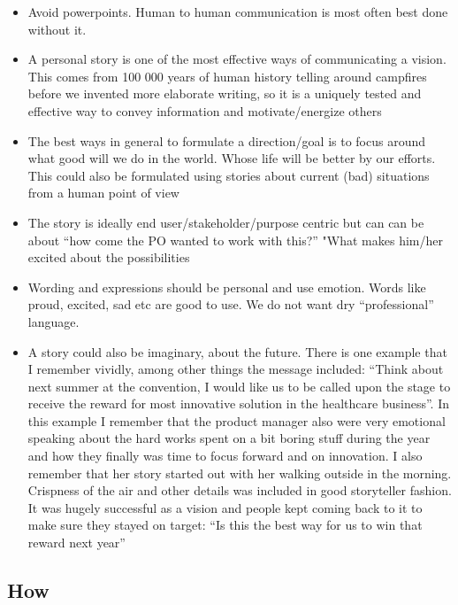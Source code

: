 \documentclass[a4paper,,tablecaptionabove]{scrartcl}
\begin{document}
\begin{itemize}
\item
  Avoid powerpoints. Human to human communication is most often best
  done without it.
\item
  A personal story is one of the most effective ways of communicating a
  vision. This comes from 100 000 years of human history telling around
  campfires before we invented more elaborate writing, so it is a
  uniquely tested and effective way to convey information and
  motivate/energize others
\item
  The best ways in general to formulate a direction/goal is to focus
  around what good will we do in the world. Whose life will be better by
  our efforts. This could also be formulated using stories about current
  (bad) situations from a human point of view
\item
  The story is ideally end user/stakeholder/purpose centric but can can
  be about \enquote{how come the PO wanted to work with this?} "What
  makes him/her excited about the possibilities
\item
  Wording and expressions should be personal and use emotion. Words like
  proud, excited, sad etc are good to use. We do not want dry
  \enquote{professional} language.\\
\item
  A story could also be imaginary, about the future. There is one
  example that I remember vividly, among other things the message
  included: \enquote{Think about next summer at the convention, I would
  like us to be called upon the stage to receive the reward for most
  innovative solution in the healthcare business}. In this example I
  remember that the product manager also were very emotional speaking
  about the hard works spent on a bit boring stuff during the year and
  how they finally was time to focus forward and on innovation. I also
  remember that her story started out with her walking outside in the
  morning. Crispness of the air and other details was included in good
  storyteller fashion. It was hugely successful as a vision and people
  kept coming back to it to make sure they stayed on target: \enquote{Is
  this the best way for us to win that reward next year}
\end{itemize}

\hypertarget{how}{%
\subsection*{How}\label{how}}
\end{document}
